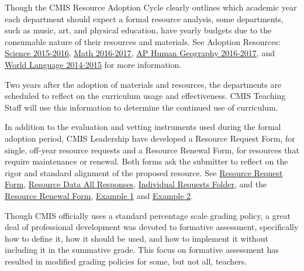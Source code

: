 \begin{findings}
Though the CMIS Resource Adoption Cycle clearly outlines which academic year each department should expect a formal resource analysis, some departments, such as music, art, and physical education, have yearly budgets due to the consumable nature of their resources and materials. See Adoption Resources: \href{https://drive.google.com/drive/folders/0ByVFfrm0zfoleXEyU3I0cTBXMVk?usp=sharing}{Science 2015-2016}, \href{https://drive.google.com/drive/folders/0ByVFfrm0zfolakRsUVNBaXhWcjQ?usp=sharing}{Math 2016-2017}, \href{https://drive.google.com/drive/folders/0ByVFfrm0zfolLUN5UThPTG5wQlE?usp=sharing}{AP Human Geography 2016-2017}, and \href{https://drive.google.com/drive/folders/0ByVFfrm0zfolfkhGeTFZSVRmSFNEZmhlaWZneEE5T0lwWjNQVnlFYVVWVlljU1RBTDZQc1k?usp=sharing}{World Language 2014-2015} for more information. 

Two years after the adoption of materials and resources, the departments are scheduled to reflect on the curriculum usage and effectiveness. CMIS Teaching Staff will use this information to determine the continued use of curriculum. 

In addition to the evaluation and vetting instruments used during the formal adoption period, CMIS Leadership have developed a Resource Request Form, for single, off-year resource requests and a Resource Renewal Form, for resources that require maintenance or renewal. Both forms ask the submitter to reflect on the rigor and standard alignment of the proposed resource. See \href{https://docs.google.com/a/cmis.ac.th/forms/d/1hBKsxgHpPSOT0MtUTsZBoVX2t3ztxeGVY4R4BVNeVL8/edit}{Resource Request Form}, \href{https://docs.google.com/a/cmis.ac.th/forms/d/1hBKsxgHpPSOT0MtUTsZBoVX2t3ztxeGVY4R4BVNeVL8/edit#responses}{Resource Data All Responses}, \href{https://drive.google.com/a/cmis.ac.th/folderview?id=0ByS3bptlVBHAejQ4NzU1N1N3czg&usp=sharing}{Individual Requests Folder}, and the \href{https://docs.google.com/a/cmis.ac.th/forms/d/1i6EnhitZ2yJZh-1OjL8jsJ2pFa7oRJCP0VcA50b_D6g/edit}{Resource Renewal Form}, \href{https://docs.google.com/a/cmis.ac.th/forms/d/1J9Q6VJRMvQKeRbV8gyk7xpHedNJdHU5Cw6Eozh6VEyA/viewanalytics}{Example 1} and \href{https://docs.google.com/a/cmis.ac.th/forms/d/1iTpwUI7XPqV5xIkZhTrpfsY5-K4vU8GkVbr0SKKZdJ8/viewanalytics}{Example 2}.


Though CMIS officially uses a standard percentage scale grading policy,  a great deal of professional development was devoted to formative assessment, specifically how to define it, how it should be used, and how to implement it without including it in the summative grade. This focus on formative assessment has resulted in modified grading policies for some, but not all, teachers. 


\end{findings}
